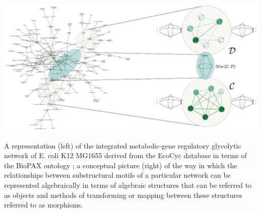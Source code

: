 \begin{frame}
\centering\includegraphics[width=0.8\framewidth]{fig/biograph.pdf}

A representation (left) of the integrated metabolic-gene regulatory glycolytic network of E. coli K12 MG1655 derived from the EcoCyc database \cite{Keseler2011} in terms of the BioPAX ontology  \cite{Demir2010}; a conceptual picture (right) of the way in which the relationships between substructural motifs of a particular network can be represented algebraically in terms of algebraic structures that can be referred to as objects and methods of transforming or mapping between these structures referred to as morphisms.
\end{frame}

